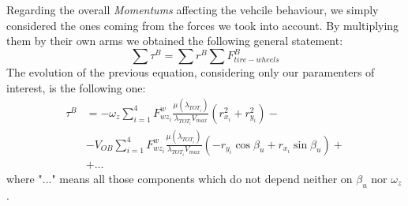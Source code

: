 \documentclass[a4paper,12pt,titlepage]{report}
\numberwithin{figure}{section}
\begin{document}
	Regarding the overall \textit{Momentums} affecting the vehcile behaviour, we simply considered the ones coming from the forces we took into account. By multiplying them by their own arms we obtained the following general statement:
		\begin{equation}
			\sum \tau^{B} = \sum r^{B} \sum F_{tire-wheels}^{B}
		\end{equation}
	The evolution of the previous equation, considering only our paramenters of interest, is the following one:  
		\begin{equation}
			\begin{split}
				\tau^{B} &= -\omega_{z}\sum_{i=1}^{4} F_{wz_{i}}^{w} \frac{\mu(\lambda_{TOT_{i}})}{\lambda_{TOT_{i}} V_{max}} (r_{x_{i}}^{2} + r_{y_{i}}^{2})- \\ &- V_{OB}\sum_{i=1}^{4} F_{wz_{i}}^{w} \frac{\mu(\lambda_{TOT_{i}})}{\lambda_{TOT_{i}} V_{max}} (- r_{y_{i}} \cos \beta_{u} + r_{x_{i}} \sin\beta_{u})+ \\ &+ ... 
			\end{split}	
		\end{equation}
	where "$ ... $" means all those components which do not depend neither on $\beta_{u}$ nor $\omega_{z}$.
\end{document}
